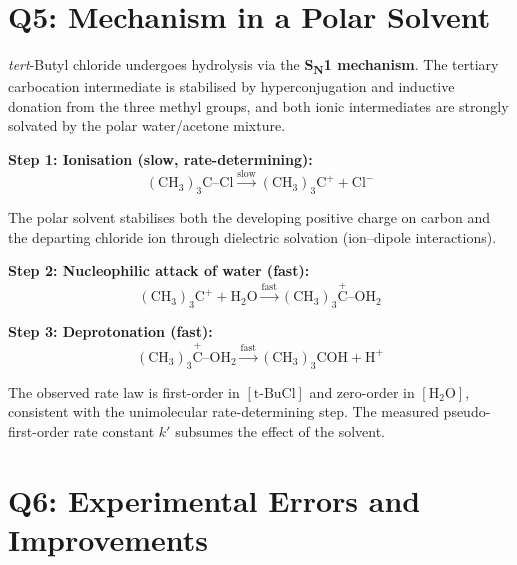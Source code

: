 \documentclass[12pt,a4paper]{article}
\begin{document}
\section*{Q5: Mechanism in a Polar Solvent}

\textit{tert}-Butyl chloride undergoes hydrolysis via the \textbf{S\textsubscript{N}1 mechanism}.
The tertiary carbocation intermediate is stabilised by hyperconjugation and inductive donation from
the three methyl groups, and both ionic intermediates are strongly solvated by the polar
water/acetone mixture.

\bigskip
\textbf{Step 1: Ionisation (slow, rate-determining):}
\[
  (\text{CH}_3)_3\text{C--Cl}
  \xrightarrow{\text{slow}}
  (\text{CH}_3)_3\text{C}^+ + \text{Cl}^-
\]

The polar solvent stabilises both the developing positive charge on carbon and the departing
chloride ion through dielectric solvation (ion--dipole interactions).

\bigskip
\textbf{Step 2: Nucleophilic attack of water (fast):}
\[
  (\text{CH}_3)_3\text{C}^+ + \text{H}_2\text{O}
  \xrightarrow{\text{fast}}
  (\text{CH}_3)_3\overset{+}{\text{C}}\text{--OH}_2
\]

\textbf{Step 3: Deprotonation (fast):}
\[
  (\text{CH}_3)_3\overset{+}{\text{C}}\text{--OH}_2
  \xrightarrow{\text{fast}}
  (\text{CH}_3)_3\text{COH} + \text{H}^+
\]

The observed rate law is first-order in $[\text{t-BuCl}]$ and zero-order in $[\text{H}_2\text{O}]$,
consistent with the unimolecular rate-determining step. The measured pseudo-first-order rate
constant $k'$ subsumes the effect of the solvent.

\section*{Q6: Experimental Errors and Improvements}
\end{document}
